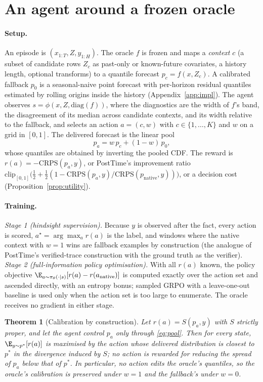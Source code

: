 \documentclass{article}
\newtheorem{theorem}{Theorem}
\newcommand{\crps}{\mathrm{CRPS}}
\begin{document}
\section{An agent around a frozen oracle}
\label{sec:agent}
\paragraph{Setup.} An episode is $(x_{1:T}, Z, y_{1:H})$. The oracle $f$ is frozen and maps a \emph{context} $c$ (a subset of candidate rows $Z_c$ as past-only or known-future covariates, a history length, optional transforms) to a quantile forecast $p_c=f(x,Z_c)$. A calibrated fallback $p_0$ is a seasonal-naive point forecast with per-horizon residual quantiles estimated by rolling origins inside the history (Appendix~\ref{app:impl}). The agent observes $s=\phi(x,Z,\mathrm{diag}(f))$, where the diagnostics are the width of $f$'s band, the disagreement of its median across candidate contexts, and its width relative to the fallback, and selects an action $a=(c,w)$ with $c\in\{1,\dots,K\}$ and $w$ on a grid in $[0,1]$. The delivered forecast is the linear pool
\begin{equation}
p_a = w\,p_c + (1-w)\,p_0,
\label{eq:pool}
\end{equation}
whose quantiles are obtained by inverting the pooled CDF. The reward is $r(a)=-\crps(p_a,y)$, or PostTime's improvement ratio $\mathrm{clip}_{[0,1]}\big(\tfrac12+\tfrac12(1-\crps(p_a,y)/\crps(p_{\mathrm{native}},y))\big)$, or a decision cost (Proposition~\ref{prop:utility}).

\paragraph{Training.} \emph{Stage 1 (hindsight supervision).} Because $y$ is observed after the fact, every action is scored, $a^\star=\arg\max_a r(a)$ is the label, and windows where the native context with $w=1$ wins are fallback examples by construction (the analogue of PostTime's verified-trace construction with the ground truth as the verifier). \emph{Stage 2 (full-information policy optimisation).} With all $r(a)$ known, the policy objective $\E_{a\sim\pi_\theta(\cdot|s)}[r(a)-r(a_{\mathrm{native}})]$ is computed exactly over the action set and ascended directly, with an entropy bonus; sampled GRPO with a leave-one-out baseline is used only when the action set is too large to enumerate. The oracle receives no gradient in either stage.

\begin{theorem}[Calibration by construction]
\label{thm:calib}
Let $r(a)=S(p_a,y)$ with $S$ strictly proper, and let the agent control $p_a$ only through \eqref{eq:pool}. Then for every state, $\E_{y\sim p^*}[r(a)]$ is maximised by the action whose delivered distribution is closest to $p^*$ in the divergence induced by $S$; no action is rewarded for reducing the spread of $p_a$ below that of $p^*$. In particular, no action edits the oracle's quantiles, so the oracle's calibration is preserved under $w=1$ and the fallback's under $w=0$.
\end{theorem}
\end{document}
